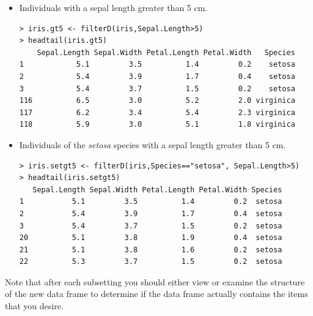 \documentclass[10pt,openany]{book}\usepackage[]{graphicx}\usepackage[]{color}
\makeatletter
\newenvironment{kframe}{%
 \def\at@end@of@kframe{}%
 \ifinner\ifhmode%
  \def\at@end@of@kframe{\end{minipage}}%
  \begin{minipage}{\columnwidth}%
 \fi\fi%
 \def\FrameCommand##1{\hskip\@totalleftmargin \hskip-\fboxsep
 \colorbox{shadecolor}{##1}\hskip-\fboxsep
     \hskip-\linewidth \hskip-\@totalleftmargin \hskip\columnwidth}%
 \MakeFramed {\advance\hsize-\width
   \@totalleftmargin\z@ \linewidth\hsize
   \@setminipage}}%
 {\par\unskip\endMakeFramed%
 \at@end@of@kframe}
\newenvironment{knitrout}{}{} %
\makeatother
\begin{document}
\begin{itemize}
  \item Individuals with a sepal length greater than 5 cm.
\begin{knitrout}
\color{fgcolor}\begin{kframe}
\begin{verbatim}
> iris.gt5 <- filterD(iris,Sepal.Length>5)
> headtail(iris.gt5)
    Sepal.Length Sepal.Width Petal.Length Petal.Width   Species
1            5.1         3.5          1.4         0.2    setosa
2            5.4         3.9          1.7         0.4    setosa
3            5.4         3.7          1.5         0.2    setosa
116          6.5         3.0          5.2         2.0 virginica
117          6.2         3.4          5.4         2.3 virginica
118          5.9         3.0          5.1         1.8 virginica
\end{verbatim}
\end{kframe}
\end{knitrout}

  \item Individuals of the \emph{setosa} species with a sepal length greater than 5 cm.
\begin{knitrout}
\color{fgcolor}\begin{kframe}
\begin{verbatim}
> iris.setgt5 <- filterD(iris,Species=="setosa", Sepal.Length>5)
> headtail(iris.setgt5)
   Sepal.Length Sepal.Width Petal.Length Petal.Width Species
1           5.1         3.5          1.4         0.2  setosa
2           5.4         3.9          1.7         0.4  setosa
3           5.4         3.7          1.5         0.2  setosa
20          5.1         3.8          1.9         0.4  setosa
21          5.1         3.8          1.6         0.2  setosa
22          5.3         3.7          1.5         0.2  setosa
\end{verbatim}
\end{kframe}
\end{knitrout}
\end{itemize}

Note that after each subsetting you should either view or examine the structure of the new data frame to determine if the data frame actually contains the items that you desire.

\end{document}
